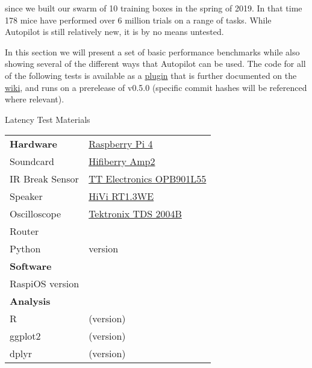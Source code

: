 
 since we built our swarm of 10 training boxes in the spring of 2019. In that time 178 mice have performed over 6 million trials on a range of tasks. While Autopilot is still relatively new, it is by no means untested.

In this section we will present a set of basic performance benchmarks while also showing several of the different ways that Autopilot can be used. The code for all of the following tests is available as a \href{https://github.com/auto-pi-lot/plugin-tests}{plugin} that is further documented on the \href{https://wiki.auto-pi-lot.com/index.php/Plugin:Autopilot_Paper}{wiki}, and runs on a prerelease of v0.5.0 (specific commit hashes will be referenced where relevant). 

\begin{margintable}[-0.5cm]
\caption{Latency Test Materials}
\label{tab:materials}
\noindent\begin{tabularx}{\linewidth}{lX}%
\toprule
\textbf{Hardware} & \href{https://www.raspberrypi.org/products/raspberry-pi-4-model-b/}{Raspberry Pi 4}\\
Soundcard & \href{https://www.hifiberry.com/shop/boards/hifiberry-amp2/}{Hifiberry Amp2} \\
IR Break Sensor & \href{https://www.digikey.com/product-detail/en/tt-electronics-optek-technology/OPB901L55/365-1767-ND/1637490}{TT Electronics OPB901L55}\\
Speaker & \href{https://www.parts-express.com/hivi-rt13we-isodynamic-tweeter--297-421}{HiVi RT1.3WE}\\
Oscilloscope & \href{https://download.tek.com/manual/071181702web.pdf}{Tektronix TDS 2004B}\\
Router & \\
\midrule
Python & version \\
\midrule
\textbf{Software} & \\
RaspiOS version & \\
\midrule
\textbf{Analysis} & \\
R & (version) \\
ggplot2 & (version) \\
dplyr & (version) \\
\bottomrule
\end{tabularx}
\end{margintable}
